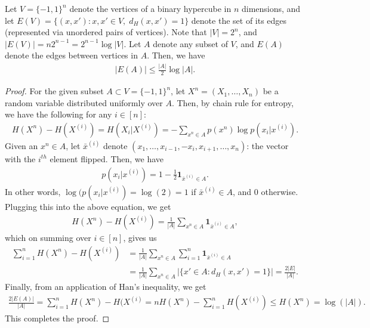             \begin{proposition}
                \label{prop:binary-hypercube}  
                Let $V = \{-1, 1\}^n$ denote the vertices of a binary hypercube in $n$ dimensions, and let $E(V) = \{ (x, x'): x, x' \in V, \; d_H(x, x')=1\}$ denote the set of its edges (represented via unordered pairs of vertices). Note that $|V|=2^n$, and $|E(V)| = n2^{n-1} = 2^{n-1} \log|V|$. Let $A$ denote any subset of $V$, and $E(A)$ denote the edges between vertices in $A$.
                Then, we have  
                \begin{align}
                    |E(A)| \leq \frac{|A|}{2} \log|A|. 
                \end{align}
            \end{proposition}
            \begin{proof}
                For the given subset $A \subset V = \{-1, 1\}^n$, let $X^n = (X_1, \ldots, X_n)$ be a random variable distributed uniformly over $A$. Then, by chain rule for entropy, we have the following for any $i \in [n]$: 
                \begin{align}
                    H(X^n) - H(X^{(i)}) = H(X_i|X^{(i)}) = -\sum_{x^n \in A} p(x^n) \log p(x_i|x^{(i)}). 
                \end{align}
                Given an $x^n \in A$, let $\bar{x}^{(i)}$ denote $(x_1, \ldots, x_{i-1}, -x_i, x_{i+1}, \ldots, x_n)$: the vector with the $i^{th}$ element flipped. Then, we have 
                \begin{align}
                    p(x_i|x^{(i)}) = 1 - \frac{1}{2} \boldsymbol{1}_{\bar{x}^{(i)} \in A}. 
                \end{align}
                In other words, $\log(p(x_i|x^{(i)}) = \log(2) = 1$ if $\bar{x}^{(i)} \in A$, and $0$ otherwise. Plugging this into the above equation, we get 
                \begin{align}
                     H(X^n) - H(X^{(i)}) = \frac{1}{|A|} \sum_{x^n \in A}  \boldsymbol{1}_{\bar{x}^{(i)} \in A}, 
                \end{align}
                which on summing over $i \in [n]$, gives us 
                \begin{align}
                    \sum_{i=1}^n H(X^n) - H(X^{(i)}) &= \frac{1}{|A|} \sum_{x^n \in A} \sum_{i=1}^n \boldsymbol{1}_{\bar{x}^{(i)} \in A} \\
                    &= \frac{1}{|A|} \sum_{x^n \in A} |\{x' \in A: d_H(x, x')=1\}| 
                    = \frac{2|E|}{|A|}. 
                \end{align}
                Finally, from an application of Han's inequality, we get 
                \begin{align}
                    \frac{2|E(A)|}{|A|} = \sum_{i=1}^n H(X^n) - H(X^{(i)} = nH(X^n) - \sum_{i=1}^n H(X^{(i)}) \leq H(X^n) = \log(|A|). 
                \end{align}
                This completes the proof. 
            \end{proof}
            
